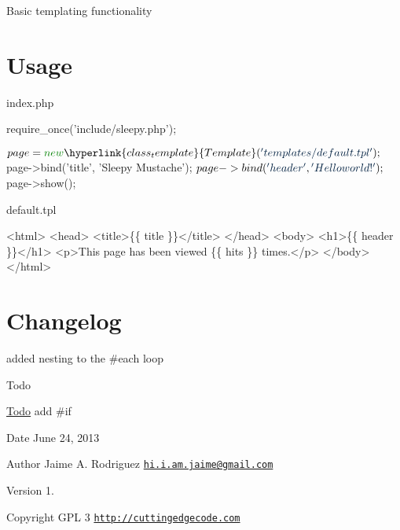 Basic templating functionality\hypertarget{template1_usage}{}\section{Usage}\label{template1_usage}
index.\-php 
\begin{DoxyCode}
require\_once(\textcolor{stringliteral}{'include/sleepy.php'});

$page = \textcolor{keyword}{new} \hyperlink{class_template}{Template}(\textcolor{stringliteral}{'templates/default.tpl'});
$page->bind(\textcolor{stringliteral}{'title'}, \textcolor{stringliteral}{'Sleepy Mustache'});
$page->bind(\textcolor{stringliteral}{'header'}, \textcolor{stringliteral}{'Hello world!'});
$page->show();
\end{DoxyCode}


default.\-tpl 
\begin{DoxyCode}
   <html>
   <head>
       <title>\{\{ title \}\}</title>
   </head>
   <body>
       <h1>\{\{ header \}\}</h1>
       <p>This page has been viewed \{\{ hits \}\} times.</p>
   </body>
</html>
\end{DoxyCode}
\hypertarget{template1_changelog}{}\section{Changelog}\label{template1_changelog}

\begin{DoxyItemize}
\item added nesting to the \#each loop
\end{DoxyItemize}

\begin{DoxyRefDesc}{Todo}
\item[\hyperlink{todo__todo000003}{Todo}]add \#if\end{DoxyRefDesc}


\begin{DoxyDate}{Date}
June 24, 2013 
\end{DoxyDate}
\begin{DoxyAuthor}{Author}
Jaime A. Rodriguez \href{mailto:hi.i.am.jaime@gmail.com}{\tt hi.\-i.\-am.\-jaime@gmail.\-com} 
\end{DoxyAuthor}
\begin{DoxyVersion}{Version}
1. 
\end{DoxyVersion}
\begin{DoxyCopyright}{Copyright}
G\-P\-L 3 \href{http://cuttingedgecode.com}{\tt http\-://cuttingedgecode.\-com} 
\end{DoxyCopyright}
